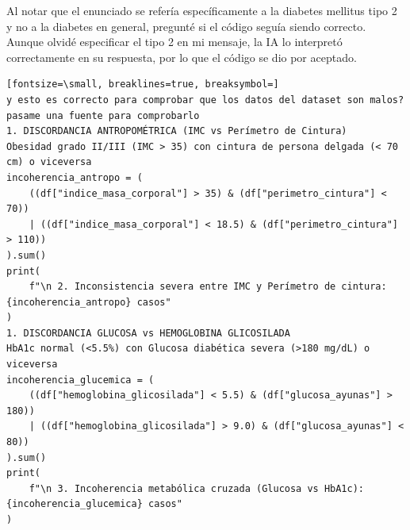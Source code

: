 \documentclass[12pt,a4paper,oneside]{book}
\begin{document}
\begin{iaanalisis}
Al notar que el enunciado se refería específicamente a la diabetes mellitus tipo 2 y no a la diabetes en general, pregunté si el código seguía siendo correcto. Aunque olvidé especificar el tipo 2 en mi mensaje, la IA lo interpretó correctamente en su respuesta, por lo que el código se dio por aceptado.
\end{iaanalisis}




\begin{iaprompt}
\begin{Verbatim}[fontsize=\small, breaklines=true, breaksymbol=]
y esto es correcto para comprobar que los datos del dataset son malos?
pasame una fuente para comprobarlo
1. DISCORDANCIA ANTROPOMÉTRICA (IMC vs Perímetro de Cintura)
Obesidad grado II/III (IMC > 35) con cintura de persona delgada (< 70 cm) o viceversa
incoherencia_antropo = (
    ((df["indice_masa_corporal"] > 35) & (df["perimetro_cintura"] < 70))
    | ((df["indice_masa_corporal"] < 18.5) & (df["perimetro_cintura"] > 110))
).sum()
print(
    f"\n 2. Inconsistencia severa entre IMC y Perímetro de cintura: {incoherencia_antropo} casos"
)
1. DISCORDANCIA GLUCOSA vs HEMOGLOBINA GLICOSILADA
HbA1c normal (<5.5%) con Glucosa diabética severa (>180 mg/dL) o viceversa
incoherencia_glucemica = (
    ((df["hemoglobina_glicosilada"] < 5.5) & (df["glucosa_ayunas"] > 180))
    | ((df["hemoglobina_glicosilada"] > 9.0) & (df["glucosa_ayunas"] < 80))
).sum()
print(
    f"\n 3. Incoherencia metabólica cruzada (Glucosa vs HbA1c): {incoherencia_glucemica} casos"
)
\end{Verbatim}
\end{iaprompt}
\end{document}

